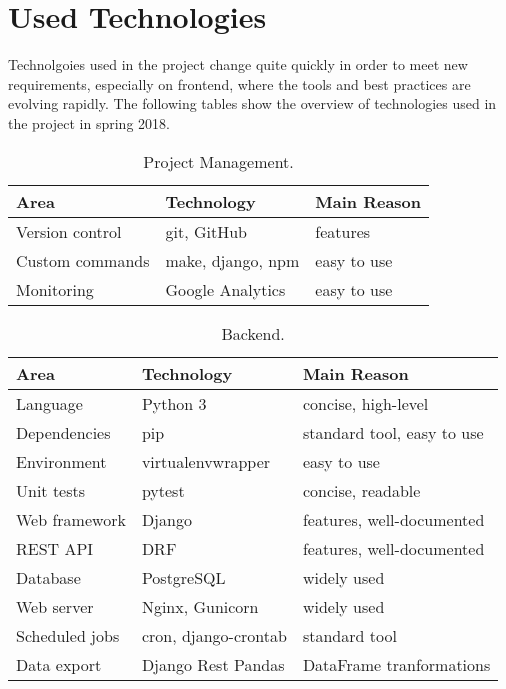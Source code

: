 \chapter{Used Technologies}
\label{chap:technologies}

Technolgoies used in the project change quite quickly in order to meet new requirements,
especially on frontend, where the tools and best practices are evolving rapidly.
The following tables show the overview of technologies used in the project in spring 2018.


\begin{table}[htb]
\centering
\caption{Project Management.}
\begin{tabular}{l l l}
\toprule
Area & Technology & Main Reason  \\
\midrule
Version control & git, GitHub & features \\
Custom commands & make, django, npm & easy to use \\
Monitoring & Google Analytics & easy to use \\
\bottomrule
\end{tabular}
\end{table}

\begin{table}[htb]
\centering
\caption{Backend.}
\begin{tabular}{l l l}
\toprule
Area & Technology & Main Reason  \\
\midrule
Language & Python 3 & concise, high-level \\
Dependencies & pip & standard tool, easy to use \\
Environment & virtualenvwrapper & easy to use \\
Unit tests & pytest & concise, readable \\
Web framework & Django & features, well-documented \\
REST API & DRF & features, well-documented \\
Database & PostgreSQL & widely used \\
Web server & Nginx, Gunicorn & widely used \\
Scheduled jobs & cron, django-crontab & standard tool \\
Data export & Django Rest Pandas & DataFrame tranformations \\ %
\bottomrule
\end{tabular}
\end{table}

